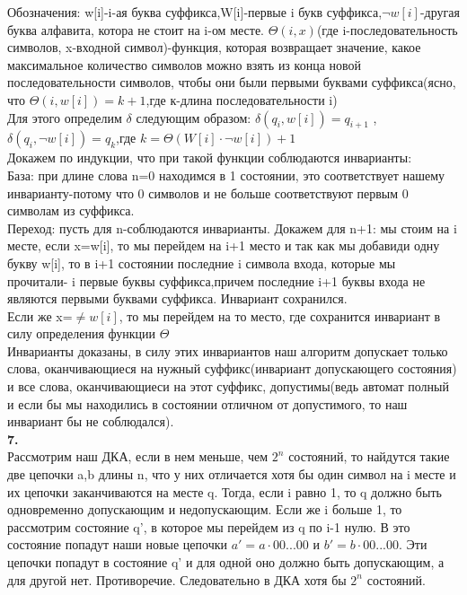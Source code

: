 \documentclass[a4paper,12pt]{article}
\begin{document}
Обозначения: w[i]-i-ая буква суффикса,W[i]-первые i букв суффикса,$\neg{w[i]}$-другая буква алфавита, котора не стоит на i-ом месте. $\Theta(i,x)$(где i-последовательность символов, x-входной символ)-функция, которая возвращает значение, какое максимальное количество символов можно взять из конца новой последовательности символов, чтобы они были первыми буквами суффикса(ясно, что $\Theta(i,{w[i]})=k+1$,где к-длина последовательности i)\\


Для этого определим $\delta$ следующим образом: $\delta(q_i,w[i])=q_{i+1}$ , $\delta(q_i,\neg w[i])=q_{k}$,где $k=\Theta(W[i]\cdot \neg w[i])+1$\\
Докажем по индукции, что при такой функции соблюдаются инварианты:\\
База: при длине слова n=0 находимся в 1 состоянии, это соответствует нашему инварианту-потому что 0 символов и не больше соответствуют первым 0 символам из суффикса.\\
Переход: пусть для  n-соблюдаются инварианты. Докажем для n+1: мы стоим на i месте, если x=w[i], то мы перейдем на i+1 место и так как мы добавиди одну букву w[i], то в i+1 состоянии последние i символа входа, которые мы прочитали- i первые буквы суффикса,причем последние i+1 буквы входа не являются первыми буквами суффикса. Инвариант сохранился.\\
Если же x=$\neq w[i]$, то мы перейдем на то место, где сохранится инвариант в силу определения функции $\Theta$\\
 Инварианты доказаны, в силу этих инвариантов наш алгоритм допускает только слова, оканчивающиеся на нужный суффикс(инвариант допускающего состояния) и все слова, оканчивающиеси на этот суффикс, допустимы(ведь автомат полный и если бы мы находились в состоянии отличном от допустимого, то наш инвариант бы не соблюдался).\\
 


\textbf{7.}\\
Рассмотрим наш ДКА, если в нем меньше, чем $2^n$  состояний, то найдутся такие две цепочки a,b  длины n, что у них отличается хотя бы один символ на i месте и их цепочки заканчиваются на месте q. Тогда, если i равно 1, то q должно быть одновременно допускающим и недопускающим. Если же i больше 1, то рассмотрим состояние q', в которое мы перейдем из q   по i-1 нулю. В это состояние попадут наши новые цепочки $a'=a\cdot{00...00}$ и $b'=b\cdot{00...00}$. Эти цепочки попадут в состояние q' и для одной оно должно быть допускающим, а для другой нет. Противоречие. Следовательно в ДКА хотя бы $2^n$  состояний.\\
\end{document}
